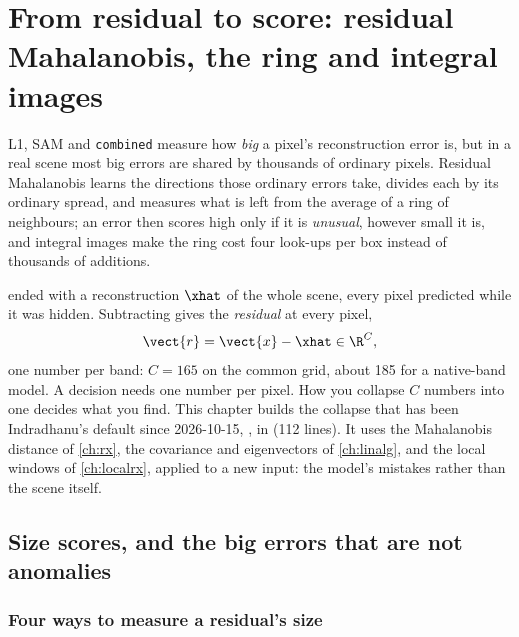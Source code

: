 \chapter{From residual to score: residual Mahalanobis, the ring and integral images}\label{ch:residualmaha}

\begin{onething}
L1, SAM and \texttt{combined} measure how \emph{big} a pixel's reconstruction error is, but in a real scene
most big errors are shared by thousands of ordinary pixels. Residual Mahalanobis learns the directions those
ordinary errors take, divides each by its ordinary spread, and measures what is left from the average of a
ring of neighbours; an error then scores high only if it is \emph{unusual}, however small it is, and
integral images make the ring cost four look-ups per box instead of thousands of additions.
\end{onething}

 ended with a reconstruction $\xhat$ of the whole scene, every pixel predicted while it
was hidden. Subtracting gives the \emph{residual} at every pixel,
\begin{equation}
\vect{r}=\vect{x}-\xhat\in\R^{C},
\end{equation}
one number per band: $C=165$ on the common grid, about 185 for a native-band model. A decision needs one
number per pixel. How you collapse $C$ numbers into one decides what you find. This chapter builds the
collapse that has been Indradhanu's default since 2026-10-15, , in
 (112 lines). It uses the Mahalanobis distance of
\cref{ch:rx}, the covariance and eigenvectors of \cref{ch:linalg}, and the local windows of
\cref{ch:localrx}, applied to a new input: the model's mistakes rather than the scene itself.

\section{Size scores, and the big errors that are not anomalies}\label{sec:residualmaha:size}

\subsection{Four ways to measure a residual's size}

